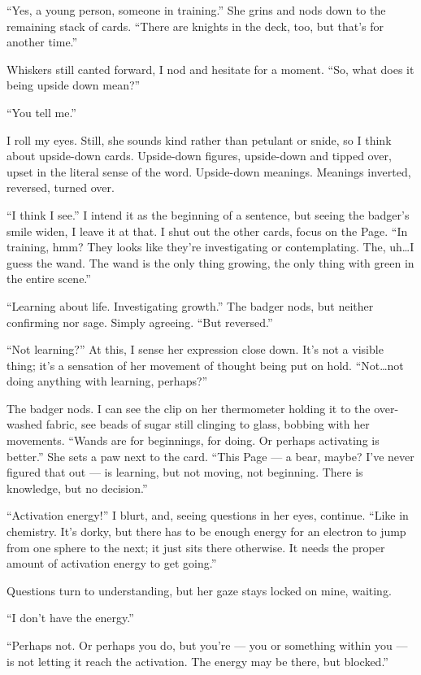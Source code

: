 ``Yes, a young person, someone in training.'' She grins and nods down to
the remaining stack of cards. ``There are knights in the deck, too, but
that's for another time.''

Whiskers still canted forward, I nod and hesitate for a moment. ``So,
what does it being upside down mean?''

``You tell me.''

I roll my eyes. Still, she sounds kind rather than petulant or snide, so
I think about upside-down cards. Upside-down figures, upside-down and
tipped over, upset in the literal sense of the word. Upside-down
meanings. Meanings inverted, reversed, turned over.

``I think I see.'' I intend it as the beginning of a sentence, but
seeing the badger's smile widen, I leave it at that. I shut out the
other cards, focus on the Page. ``In training, hmm? They looks like
they're investigating or contemplating. The, uh\ldots{}I guess the wand.
The wand is the only thing growing, the only thing with green in the
entire scene.''

``Learning about life. Investigating growth.'' The badger nods, but
neither confirming nor sage. Simply agreeing. ``But reversed.''

``Not learning?'' At this, I sense her expression close down. It's not a
visible thing; it's a sensation of her movement of thought being put on
hold. ``Not\ldots{}not doing anything with learning, perhaps?''

The badger nods. I can see the clip on her thermometer holding it to the
over-washed fabric, see beads of sugar still clinging to glass, bobbing
with her movements. ``Wands are for beginnings, for doing. Or perhaps
activating is better.'' She sets a paw next to the card. ``This Page ---
a bear, maybe? I've never figured that out --- is learning, but not
moving, not beginning. There is knowledge, but no decision.''

``Activation energy!'' I blurt, and, seeing questions in her eyes,
continue. ``Like in chemistry. It's dorky, but there has to be enough
energy for an electron to jump from one sphere to the next; it just sits
there otherwise. It needs the proper amount of activation energy to get
going.''

Questions turn to understanding, but her gaze stays locked on mine,
waiting.

``I don't have the energy.''

``Perhaps not. Or perhaps you do, but you're --- you or something within
you --- is not letting it reach the activation. The energy may be there,
but blocked.''

